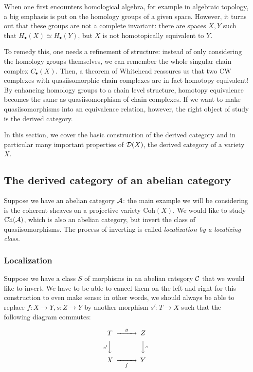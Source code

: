 When one first encounters homological algebra, for example in algebraic topology, a big emphasis is put on the homology groups of a given space. However, it turns out that these groups are not a complete invariant: there are spaces $X,Y$ such that $H_\bullet(X) \simeq H_\bullet(Y)$, but $X$ is not homotopically equivalent to $Y$. 

To remedy this, one needs a refinement of structure: instead of only considering the homology groups themselves, we can remember the whole singular chain complex $C_\bullet(X)$. Then, a theorem of Whitehead reassures us that two CW complexes with quasiisomorphic chain complexes are in fact homotopy equivalent! By enhancing homology groups to a chain level structure, homotopy equivalence becomes the same as quasiisomorphism of chain complexes. If we want to make quasiisomorphisms into an equivalence relation, however, the right object of study is the derived category. 

In this section, we cover the basic construction of the derived category and in particular many important properties of $\mathcal{D}(X)$, the derived category of a variety $X$.

\subsection{The derived category of an abelian category}

Suppose we have an abelian category $\mathcal{A}$: the main example we will be considering is the coherent sheaves on a projective variety $\mathrm{Coh}(X)$. We would like to study $\mathrm{Ch}(\mathcal{A})$, which is also an abelian category, but invert the class of quasiisomorphisms. The process of inverting is called \emph{localization by a localizing class.} 
\subsubsection{Localization}

Suppose we have a class $S$ of morphisms in an abelian category $\mathcal{C}$ that we would like to invert. We have to be able to cancel them on the left and right for this construction to even make sense: in other words, we should always be able to replace $f:X\to Y, s:Z\to Y$ by another morphism $s':T\to X$ such that the following diagram commutes:

\begin{equation*}
    \begin{CD}
        T @>g>> Z \\
          @Vs'VV @VVsV \\
        X @>>f> Y
    \end{CD}
\end{equation*}

